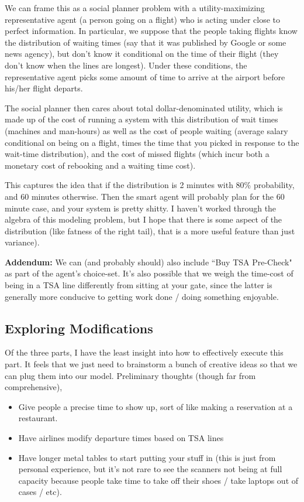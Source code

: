 \documentclass[]{article}
\begin{document}
We can frame this as a social planner problem with a utility-maximizing representative agent (a person going on a flight) who is acting under close to perfect information. In particular, we suppose that the people taking flights know the distribution of waiting times (say that it was published by Google or some news agency), but don't know it conditional on the time of their flight (they don't know when the lines are longest). Under these conditions, the representative agent picks some amount of time to arrive at the airport before his/her flight departs. \medskip

The social planner then cares about total dollar-denominated utility, which is made up of the cost of running a system with this distribution of wait times (machines and man-hours) as well as the cost of people waiting (average salary conditional on being on a flight, times the time that you picked in response to the wait-time distribution), and the cost of missed flights (which incur both a monetary cost of rebooking and a waiting time cost). \medskip

This captures the idea that if the distribution is 2 minutes with 80\% probability, and 60 minutes otherwise. Then the smart agent will probably plan for the 60 minute case, and your system is pretty shitty. I haven't worked through the algebra of this modeling problem, but I hope that there is some aspect of the distribution (like fatness of the right tail), that is a more useful feature than just variance). \medskip

{\bf Addendum:} We can (and probably should) also include ``Buy TSA Pre-Check" as part of the agent's choice-set. It's also possible that we weigh the time-cost of being in a TSA line differently from sitting at your gate, since the latter is generally more conducive to getting work done / doing something enjoyable.

\subsection{Exploring Modifications}

Of the three parts, I have the least insight into how to effectively execute this part. It feels that we just need to brainstorm a bunch of creative ideas so that we can plug them into our model. Preliminary thoughts (though far from comprehensive),

\begin{itemize}
	\item Give people a precise time to show up, sort of like making a reservation at a restaurant.
	\item Have airlines modify departure times based on TSA lines
	\item Have longer metal tables to start putting your stuff in (this is just from personal experience, but it's not rare to see the scanners not being at full capacity because people take time to take off their shoes / take laptops out of cases / etc).
\end{itemize}
\end{document}
